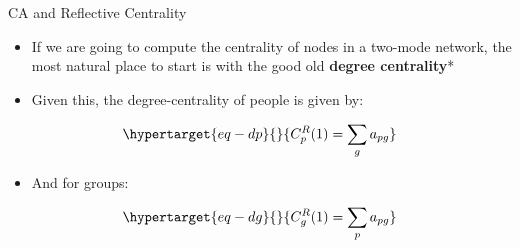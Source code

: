 \documentclass[
  ignorenonframetext,
]{beamer}
\providecommand{\tightlist}{%
  \setlength{\itemsep}{0pt}\setlength{\parskip}{0pt}}\usepackage{longtable,booktabs,array}
\begin{document}
\begin{frame}{CA and Reflective Centrality}
\protect\hypertarget{ca-and-reflective-centrality-2}{}
\begin{itemize}
\item
  If we are going to compute the centrality of nodes in a two-mode
  network, the most natural place to start is with the good old
  \textbf{degree centrality}*
\item
  Given this, the degree-centrality of people is given by:
\end{itemize}

\begin{equation}\protect\hypertarget{eq-dp}{}{
C^R_p(1) = \sum_g a_{pg}
}\label{eq-dp}\end{equation}

\begin{itemize}
\tightlist
\item
  And for groups:
\end{itemize}

\begin{equation}\protect\hypertarget{eq-dg}{}{
   C^R_g(1) = \sum_p a_{pg}
}\label{eq-dg}\end{equation}

\end{frame}
\end{document}
